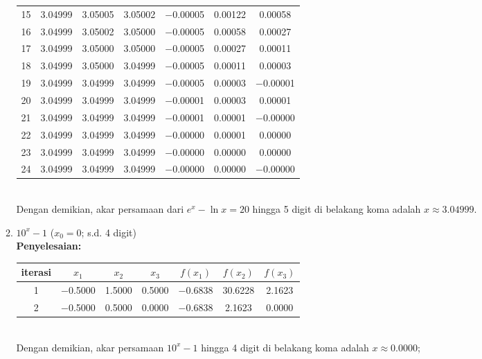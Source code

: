 \documentclass{article}
\newcommand{\penyelesaian}{\textbf{Penyelesaian: }}
\begin{document}
\begin{enumerate}
\begin{enumerate}
\begin{tabular}{|c|c|c|c|c|c|c|}
            15 & \num{3,04999} & \num{3,05005} & \num{3,05002} & \num{-0,00005} & \num{0,00122} & \num{0,00058}\\
            16 & \num{3,04999} & \num{3,05002} & \num{3,05000} & \num{-0,00005} & \num{0,00058} & \num{0,00027}\\
            17 & \num{3,04999} & \num{3,05000} & \num{3,05000} & \num{-0,00005} & \num{0,00027} & \num{0,00011}\\
            18 & \num{3,04999} & \num{3,05000} & \num{3,04999} & \num{-0,00005} & \num{0,00011} & \num{0,00003}\\
            19 & \num{3,04999} & \num{3,04999} & \num{3,04999} & \num{-0,00005} & \num{0,00003} & \num{-0,00001}\\
            20 & \num{3,04999} & \num{3,04999} & \num{3,04999} & \num{-0,00001} & \num{0,00003} & \num{0,00001}\\
            21 & \num{3,04999} & \num{3,04999} & \num{3,04999} & \num{-0,00001} & \num{0,00001} & \num{-0,00000}\\
            22 & \num{3,04999} & \num{3,04999} & \num{3,04999} & \num{-0,00000} & \num{0,00001} & \num{0,00000}\\
            23 & \num{3,04999} & \num{3,04999} & \num{3,04999} & \num{-0,00000} & \num{0,00000} & \num{0,00000}\\
            24 & \num{3,04999} & \num{3,04999} & \num{3,04999} & \num{-0,00000} & \num{0,00000} & \num{-0,00000}\\
             \hline
            \end{tabular} \\           
        Dengan demikian, akar persamaan dari $e^x - \ln{x} = 20$ hingga 5 digit di belakang koma adalah $x \approx \num{3,04999}$.  

        \item $10^x - 1$ ($x_0 = \num{0}$; s.d. 4 digit) \\ 
        \penyelesaian \\
        \begin{tabular}{|c|c|c|c|c|c|c|}
            \hline
            iterasi & $x_1$ & $x_2$ & $x_3$ & $f(x_1)$ & $f(x_2)$ & $f(x_3)$ \\
            \hline
            1 & \num{-0,5000} & \num{1,5000} & \num{0,5000} & \num{-0,6838} & \num{30,6228} & \num{2,1623}\\
            2 & \num{-0,5000} & \num{0,5000} & \num{0,0000} & \num{-0,6838} & \num{2,1623} & \num{0,0000}\\
             \hline
            \end{tabular} \\
        Dengan demikian, akar persamaan $10^x - 1$ hingga 4 digit di belakang koma adalah $x \approx \num{0,0000}$;
    \end{enumerate}


\end{enumerate}
\end{document}
